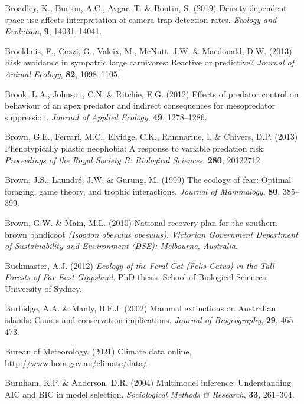 \documentclass[11pt,a4paper,titlepage,twoside,openright]{style/unimelbthesis}
\begin{document}
\begin{mainmatter}
\leavevmode\hypertarget{ref-broadley2019density}{}%
Broadley, K., Burton, A.C., Avgar, T. \& Boutin, S. (2019) Density-dependent space use affects interpretation of camera trap detection rates. \emph{Ecology and Evolution}, \textbf{9}, 14031--14041.

\leavevmode\hypertarget{ref-broekhuis2013risk}{}%
Broekhuis, F., Cozzi, G., Valeix, M., McNutt, J.W. \& Macdonald, D.W. (2013) Risk avoidance in sympatric large carnivores: Reactive or predictive? \emph{Journal of Animal Ecology}, \textbf{82}, 1098--1105.

\leavevmode\hypertarget{ref-brook2012effects}{}%
Brook, L.A., Johnson, C.N. \& Ritchie, E.G. (2012) Effects of predator control on behaviour of an apex predator and indirect consequences for mesopredator suppression. \emph{Journal of Applied Ecology}, \textbf{49}, 1278--1286.

\leavevmode\hypertarget{ref-brown2013phenotypically}{}%
Brown, G.E., Ferrari, M.C., Elvidge, C.K., Ramnarine, I. \& Chivers, D.P. (2013) Phenotypically plastic neophobia: A response to variable predation risk. \emph{Proceedings of the Royal Society B: Biological Sciences}, \textbf{280}, 20122712.

\leavevmode\hypertarget{ref-brown1999ecology}{}%
Brown, J.S., Laundré, J.W. \& Gurung, M. (1999) The ecology of fear: Optimal foraging, game theory, and trophic interactions. \emph{Journal of Mammalogy}, \textbf{80}, 385--399.

\leavevmode\hypertarget{ref-brown2010national}{}%
Brown, G.W. \& Main, M.L. (2010) National recovery plan for the southern brown bandicoot \emph{(Isoodon obesulus obesulus)}. \emph{Victorian Government Department of Sustainability and Environment (DSE): Melbourne, Australia}.

\leavevmode\hypertarget{ref-buckmaster2012ecology}{}%
Buckmaster, A.J. (2012) \emph{Ecology of the Feral Cat (Felis Catus) in the Tall Forests of Far East Gippsland}. PhD thesis, School of Biological Sciences; University of Sydney.

\leavevmode\hypertarget{ref-burbidge2002mammal}{}%
Burbidge, A.A. \& Manly, B.F.J. (2002) Mammal extinctions on Australian islands: Causes and conservation implications. \emph{Journal of Biogeography}, \textbf{29}, 465--473.

\leavevmode\hypertarget{ref-BOM2021}{}%
Bureau of Meteorology. (2021) Climate data online, \url{http://www.bom.gov.au/climate/data/}

\leavevmode\hypertarget{ref-burnham2004multimodel}{}%
Burnham, K.P. \& Anderson, D.R. (2004) Multimodel inference: Understanding AIC and BIC in model selection. \emph{Sociological Methods \& Research}, \textbf{33}, 261--304.


\end{mainmatter}
\end{document}
